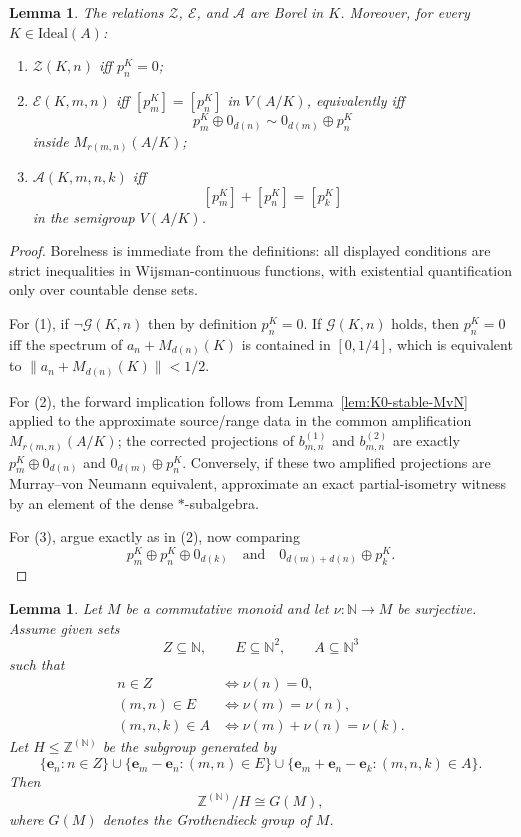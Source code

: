 \documentclass[12pt,fleqn,a4paper]{amsart}
\renewcommand{\le}{\leqslant}
\numberwithin{equation}{section}
\newtheorem{lemma}[theorem]{Lemma}
\theoremstyle{definition}
\newcommand{\N}{\mathbb{N}}
\newcommand{\Z}{\mathbb{Z}}
\newcommand{\Ideal}{\mathrm{Ideal}}
\begin{document}
\begin{lemma}\label{lem:K0-relations}
The relations $\mathcal Z$, $\mathcal E$, and $\mathcal A$ are Borel in $K$.
Moreover, for every $K\in\Ideal(A)$:
\begin{enumerate}
\item $\mathcal Z(K,n)$ iff $p_n^K=0$;
\item $\mathcal E(K,m,n)$ iff $[p_m^K]=[p_n^K]$ in $V(A/K)$, equivalently iff
\[
p_m^K\oplus 0_{d(n)} \sim 0_{d(m)}\oplus p_n^K
\]
inside $M_{r(m,n)}(A/K)$;
\item $\mathcal A(K,m,n,k)$ iff
\[
[p_m^K]+[p_n^K]=[p_k^K]
\]
in the semigroup $V(A/K)$.
\end{enumerate}
\end{lemma}

\begin{proof}
Borelness is immediate from the definitions: all displayed conditions are strict
inequalities in Wijsman-continuous functions, with existential quantification only over
countable dense sets.

For (1), if $\neg\mathcal G(K,n)$ then by definition $p_n^K=0$.
If $\mathcal G(K,n)$ holds, then $p_n^K=0$ iff the spectrum of $a_n+M_{d(n)}(K)$ is
contained in $[0,1/4]$, which is equivalent to
$\|a_n+M_{d(n)}(K)\|<1/2$.

For (2), the forward implication follows from Lemma~\ref{lem:K0-stable-MvN} applied to
the approximate source/range data in the common amplification $M_{r(m,n)}(A/K)$; the
corrected projections of $b_{m,n}^{(1)}$ and $b_{m,n}^{(2)}$ are exactly
$p_m^K\oplus 0_{d(n)}$ and $0_{d(m)}\oplus p_n^K$.
Conversely, if these two amplified projections are Murray--von Neumann equivalent, approximate
an exact partial-isometry witness by an element of the dense $*$-subalgebra.

For (3), argue exactly as in (2), now comparing
\[
p_m^K\oplus p_n^K\oplus 0_{d(k)}
\quad\text{and}\quad
0_{d(m)+d(n)}\oplus p_k^K.
\]
\end{proof}

\begin{lemma}
\label{lem:Groth-presentation}
Let $M$ be a commutative monoid and let $\nu:\N\to M$ be surjective.
Assume given sets
\[
Z\subseteq \N,\qquad E\subseteq \N^2,\qquad A\subseteq \N^3
\]
such that
\[
\begin{aligned}
n\in Z &\iff \nu(n)=0,\\
(m,n)\in E &\iff \nu(m)=\nu(n),\\
(m,n,k)\in A &\iff \nu(m)+\nu(n)=\nu(k).
\end{aligned}
\]
Let $H\le \Z^{(\N)}$ be the subgroup generated by
\[
\{\mathbf e_n:n\in Z\}\cup
\{\mathbf e_m-\mathbf e_n:(m,n)\in E\}\cup
\{\mathbf e_m+\mathbf e_n-\mathbf e_k:(m,n,k)\in A\}.
\]
Then
\[
\Z^{(\N)}/H\cong G(M),
\]
where $G(M)$ denotes the Grothendieck group of $M$.
\end{lemma}
\end{document}
